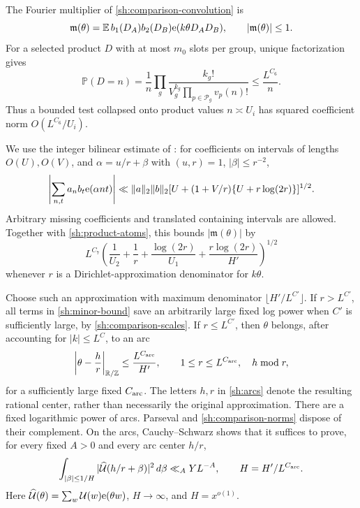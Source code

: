 The Fourier multiplier of \eqref{sh:comparison-convolution} is
\[
 \mathfrak m(\theta)=\mathbb E\,b_1(D_A)b_2(D_B)
                                     \mathrm{e}(k\theta D_AD_B),
 \qquad |\mathfrak m(\theta)|\leq1.
\]
For a selected product $D$ with at most $m_0$ slots per group,
unique factorization gives
\begin{equation}\label{sh:product-atoms}
 \mathbb P(D=n)=\frac1n\prod_g
       \frac{k_g!}{V_g^{k_g}\prod_{p\in\mathcal P_g}v_p(n)!}
 \leq\frac{L^{C_6}}n.
\end{equation}
Thus a bounded test collapsed onto product values $n\asymp U_i$
has squared coefficient norm $O(L^{C_6}/U_i)$.

We use the integer bilinear estimate of
\cite[Section~4, Lemma~4.2]{SmoothShifted}: for coefficients on
intervals of lengths $O(U),O(V)$, and
$\alpha=u/r+\beta$ with $(u,r)=1$, $|\beta|\leq r^{-2}$,
\[
 \left|\sum_{n,t}a_nb_t\mathrm{e}(\alpha nt)\right|
 \ll\|a\|_2\|b\|_2
       [U+(1+V/r)\{U+r\log(2r)\}]^{1/2}.
\]
Arbitrary missing coefficients and translated containing intervals
are allowed.  Together with \eqref{sh:product-atoms}, this bounds
$|\mathfrak m(\theta)|$ by
\begin{equation}\label{sh:minor-bound}
 L^{C_7}\left(\frac1{U_2}+\frac1r+
          \frac{\log(2r)}{U_1}+
          \frac{r\log(2r)}{H'}\right)^{1/2}
\end{equation}
whenever $r$ is a Dirichlet-approximation denominator for $k\theta$.

Choose such an approximation with maximum denominator
$\lfloor H'/L^{C'}\rfloor$.  If $r>L^{C'}$, all terms in
\eqref{sh:minor-bound} save an arbitrarily large fixed log power
when $C'$ is sufficiently large, by \eqref{sh:comparison-scales}.
If $r\leq L^{C'}$, then $\theta$ belongs, after accounting for
$|k|\leq L^C$, to an arc
\begin{equation}\label{sh:arcs}
 \left|\theta-\frac hr\right|_{\mathbb R/\mathbb Z}
 \leq\frac{L^{C_{\rm arc}}}{H'},
 \qquad 1\leq r\leq L^{C_{\rm arc}},\quad h\bmod r,
\end{equation}
for a sufficiently large fixed $C_{\rm arc}$.  The letters $h,r$
in \eqref{sh:arcs} denote the resulting rational center, rather
than necessarily the original approximation.  There are a fixed
logarithmic power of arcs.  Parseval and
\eqref{sh:comparison-norms} dispose of their complement.  On the
arcs, Cauchy--Schwarz shows that it suffices to prove, for every
fixed $A>0$ and every arc center $h/r$,
\begin{equation}\label{sh:arc-target}
 \int_{|\beta|\leq1/H}
   |\widehat{\mathcal U}(h/r+\beta)|^2\,d\beta
 \ll_A YL^{-A},\qquad H=H'/L^{C_{\rm arc}}.
\end{equation}
Here $\widehat{\mathcal U}(\theta)=\sum_w\mathcal U(w)\mathrm{e}(\theta w)$,
$H\to\infty$, and $H=x^{o(1)}$.

